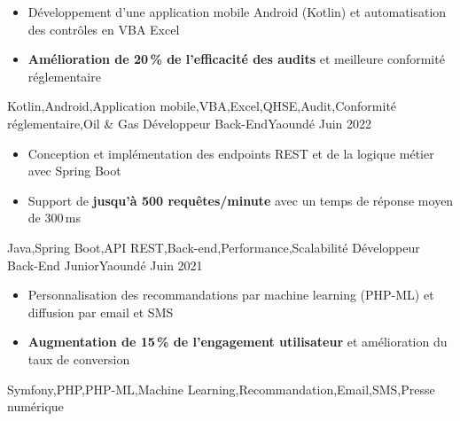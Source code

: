 \begin{experiences}
{\begin{itemize}
                        \item Développement d'une application mobile Android (Kotlin) et automatisation des contrôles en VBA Excel
                        \item \textbf{Amélioration de 20\,\% de l'efficacité des audits} et meilleure conformité réglementaire
                      \end{itemize}
                    }
                    {Kotlin,Android,Application mobile,VBA,Excel,QHSE,Audit,Conformité réglementaire,Oil \& Gas}
  \emptySeparator
     {Développeur Back-End}{}{Yaoundé}
    {Juin 2022} {
                      \begin{itemize}
                        \item Conception et implémentation des endpoints REST et de la logique métier avec Spring Boot
                        \item Support de \textbf{jusqu'à 500 requêtes/minute} avec un temps de réponse moyen de 300\,ms
                      \end{itemize}
                    }
                    {Java,Spring Boot,API REST,Back-end,Performance,Scalabilité}
  \emptySeparator
     {Développeur Back-End Junior}{}{Yaoundé}
    {Juin 2021} {
                      \begin{itemize}
                        \item Personnalisation des recommandations par machine learning (PHP-ML) et diffusion par email et SMS
                        \item \textbf{Augmentation de 15\,\% de l'engagement utilisateur} et amélioration du taux de conversion
                      \end{itemize}
                    }
                    {Symfony,PHP,PHP-ML,Machine Learning,Recommandation,Email,SMS,Presse numérique}
\end{experiences}
